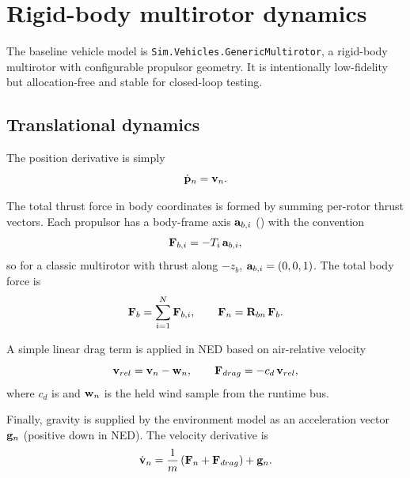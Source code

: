 \section{Rigid-body multirotor dynamics}
\label{sec:rigid-body}

The baseline vehicle model is \texttt{Sim.Vehicles.GenericMultirotor}, a rigid-body multirotor with configurable propulsor geometry. It is intentionally low-fidelity but allocation-free and stable for closed-loop testing.

\subsection{Translational dynamics}
The position derivative is simply
\begin{equation}
  \dot{\mathbf{p}}_n = \mathbf{v}_n.
\end{equation}

The total thrust force in body coordinates is formed by summing per-rotor thrust vectors. Each propulsor has a body-frame axis \(\mathbf{a}_{b,i}\) () with the convention
\begin{equation}
  \mathbf{F}_{b,i} = -T_i\,\mathbf{a}_{b,i},
\end{equation}
so for a classic multirotor with thrust along \(-z_b\), \(\mathbf{a}_{b,i}=(0,0,1)\). The total body force is
\begin{equation}
  \mathbf{F}_b = \sum_{i=1}^{N} \mathbf{F}_{b,i}, \qquad \mathbf{F}_n = \mathbf{R}_{bn}\,\mathbf{F}_b.
\end{equation}

A simple linear drag term is applied in NED based on air-relative velocity
\begin{equation}
  \mathbf{v}_{rel} = \mathbf{v}_n - \mathbf{w}_n, \qquad \mathbf{F}_{drag} = -c_d\,\mathbf{v}_{rel},
\end{equation}
where \(c_d\) is  and \(\mathbf{w}_n\) is the held wind sample from the runtime bus.

Finally, gravity is supplied by the environment model as an acceleration vector \(\mathbf{g}_n\) (positive down in NED). The velocity derivative is
\begin{equation}
  \dot{\mathbf{v}}_n = \frac{1}{m}\left(\mathbf{F}_n + \mathbf{F}_{drag}\right) + \mathbf{g}_n.
\end{equation}

